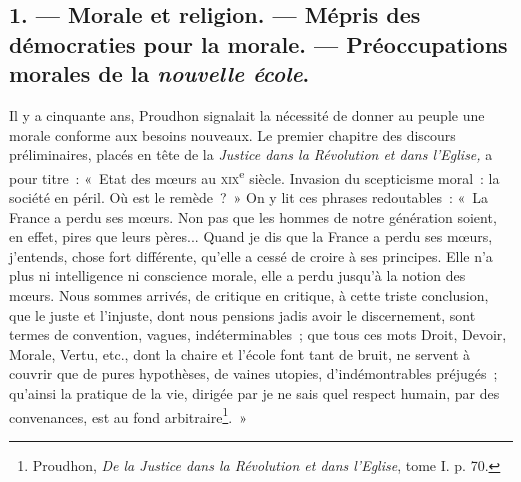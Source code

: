 \documentclass[french,twoside]{book} %
\begin{document}
\subsection[{1. — Morale et religion. — Mépris des démocraties pour la morale. — Préoccupations morales de la nouvelle école.}]{1. — Morale et religion. — Mépris des démocraties pour la morale. — Préoccupations morales de la \emph{nouvelle école}.}
\label{p30}
\noindent Il y a cinquante ans, Proudhon signalait la nécessité de donner au peuple une morale conforme aux besoins nouveaux. Le premier chapitre des discours préliminaires, placés en tête de la \emph{Justice dans la Révolution et dans l’Eglise,} a pour titre : « Etat des mœurs au {\scshape xix}\textsuperscript{e} siècle. Invasion du scepticisme moral : la société en péril. Où est le remède ? » On y lit ces phrases redoutables :  « La France a perdu ses mœurs. Non pas que les hommes de notre génération soient, en effet, pires que leurs pères... Quand je dis que la France a perdu ses mœurs, j’entends, chose fort différente, qu’elle a cessé de croire à ses principes. Elle n’a plus ni intelligence ni conscience morale, elle a perdu jusqu’à la notion des mœurs. Nous sommes arrivés, de critique en critique, à cette triste conclusion, que le juste et l’injuste, dont nous pensions jadis avoir le discernement, sont termes de convention, vagues, indéterminables ; que tous ces mots Droit, Devoir, Morale, Vertu, etc., dont la chaire et l’école font tant de bruit, ne servent à couvrir que de pures hypothèses, de vaines utopies, d’indémontrables préjugés ; qu’ainsi la pratique de la vie, dirigée par je ne sais quel respect humain, par des convenances, est au fond arbitraire\footnote{ \noindent Proudhon, \emph{De la Justice dans la Révolution et dans l’Eglise}, tome I. p. 70.
 }. »\par
\end{document}
